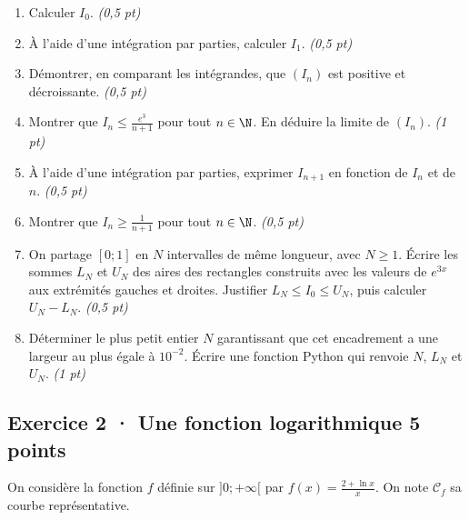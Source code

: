 \begin{enumerate}

\item Calculer $I_0$. \hfill\textit{(0,5 pt)}

\item À l'aide d'une intégration par parties, calculer $I_1$. \hfill\textit{(0,5 pt)}

\item Démontrer, en comparant les intégrandes, que $(I_n)$ est positive et décroissante. \hfill\textit{(0,5 pt)}

\item Montrer que $I_n\le\frac{e^{3}}{n+1}$ pour tout $n\in\N$. En déduire la limite de $(I_n)$. \hfill\textit{(1 pt)}

\item À l'aide d'une intégration par parties, exprimer $I_{n+1}$ en fonction de $I_n$ et de $n$. \hfill\textit{(0,5 pt)}

\item Montrer que $I_n\ge\frac1{n+1}$ pour tout $n\in\N$. \hfill\textit{(0,5 pt)}

\item On partage $[0;1]$ en $N$ intervalles de même longueur, avec $N\ge1$. Écrire les sommes $L_N$ et $U_N$ des aires des rectangles construits avec les valeurs de $e^{3x}$ aux extrémités gauches et droites. Justifier $L_N\le I_0\le U_N$, puis calculer $U_N-L_N$. \hfill\textit{(0,5 pt)}

\item Déterminer le plus petit entier $N$ garantissant que cet encadrement a une largeur au plus égale à $10^{-2}$. Écrire une fonction Python qui renvoie $N$, $L_N$ et $U_N$. \hfill\textit{(1 pt)}

\end{enumerate}

\subsection*{Exercice 2 · Une fonction logarithmique \hfill 5 points}On considère la fonction $f$ définie sur $]0;+\infty[$ par $f(x)=\frac{2+\ln x}x$. On note $\mathcal C_f$ sa courbe représentative.

